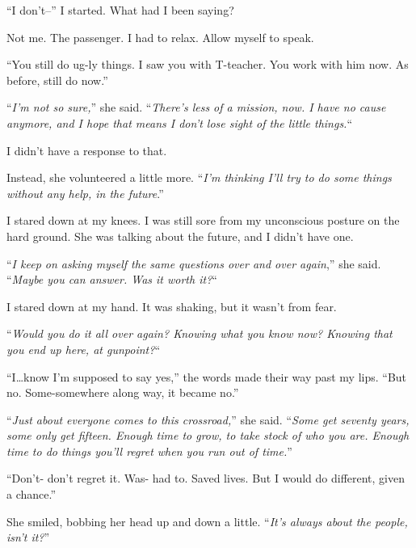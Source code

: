``I don't--'' I started.  What had I been saying?



Not me.  The passenger.  I had to relax.  Allow myself to speak.



``You still do ug-ly things.  I saw you with T-teacher.  You work with him now.  As before, still do now.''



``\emph{I'm not so sure,}'' she said.  ``\emph{There's less of a mission, now.  I have no cause anymore, and I hope that means I don't lose sight of the little things.}``



I didn't have a response to that.



Instead, she volunteered a little more.  ``\emph{I'm thinking I'll try to do some things without any help, in the future}.''



I stared down at my knees.  I was still sore from my unconscious posture on the hard ground.  She was talking about the future, and I didn't have one.



``\emph{I keep on asking myself the same questions over and over again},'' she said.  ``\emph{Maybe you can answer.  Was it worth it?}``



I stared down at my hand.  It was shaking, but it wasn't from fear.



``\emph{Would you do it all over again?  Knowing what you know now?  Knowing that you end up here, at gunpoint?}``



``I\ldots know I'm supposed to say yes,'' the words made their way past my lips.  ``But no.  Some-somewhere along way, it became no.''



``\emph{Just about everyone comes to this crossroad,}'' she said.  ``\emph{Some get seventy years, some only get fifteen.  Enough time to grow, to take stock of who you are.  Enough time to do things you'll regret when you run out of time.}''



``Don't- don't regret it.  Was- had to.  Saved lives.  But I would do different, given a chance.''



She smiled, bobbing her head up and down a little.  ``\emph{It's always about the people, isn't it?}''



